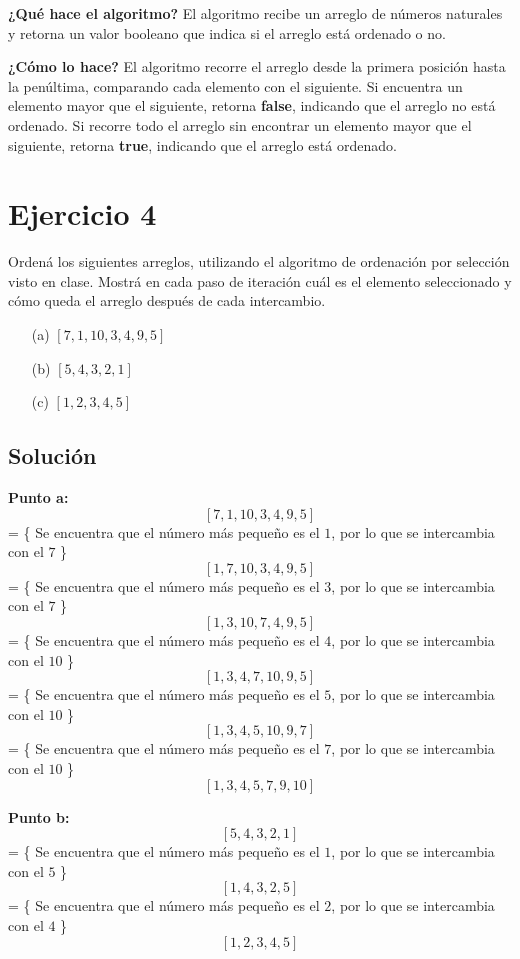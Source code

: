 \documentclass{article}
\begin{document}
\textbf{¿Qué hace el algoritmo?} El algoritmo recibe un arreglo de números naturales y retorna un valor booleano que indica si el arreglo está ordenado o no.

\textbf{¿Cómo lo hace?} El algoritmo recorre el arreglo desde la primera posición hasta la penúltima, comparando cada elemento con el siguiente. Si encuentra un elemento mayor que el siguiente, retorna \textbf{false}, indicando que el arreglo no está ordenado. Si recorre todo el arreglo sin encontrar un elemento mayor que el siguiente, retorna \textbf{true}, indicando que el arreglo está ordenado.

\section*{Ejercicio 4}
Ordená los siguientes arreglos, utilizando el algoritmo de ordenación por selección visto en clase. Mostrá en cada paso de iteración cuál es el elemento seleccionado y cómo queda el arreglo después de cada intercambio.

\begin{itemize}
    \item[(a)] $[7, 1, 10, 3, 4, 9, 5]$
    \item[(b)] $[5, 4, 3, 2, 1]$
    \item[(c)] $[1, 2, 3, 4, 5]$
\end{itemize}

\subsection*{Solución}
\textbf{Punto a:} 
$$[7, 1, 10, 3, 4, 9, 5]$$
= \{ Se encuentra que el número más pequeño es el $1$, por lo que se intercambia con el $7$ \}
$$[1, 7, 10, 3, 4, 9, 5]$$
= \{ Se encuentra que el número más pequeño es el $3$, por lo que se intercambia con el $7$ \}
$$[1, 3, 10, 7, 4, 9, 5]$$
= \{ Se encuentra que el número más pequeño es el $4$, por lo que se intercambia con el $10$ \}
$$[1, 3, 4, 7, 10, 9, 5]$$
= \{ Se encuentra que el número más pequeño es el $5$, por lo que se intercambia con el $10$ \}
$$[1, 3, 4, 5, 10, 9, 7]$$
= \{ Se encuentra que el número más pequeño es el $7$, por lo que se intercambia con el $10$ \}
$$[1, 3, 4, 5, 7, 9, 10]$$


\textbf{Punto b:}
$$[5, 4, 3, 2, 1]$$
= \{ Se encuentra que el número más pequeño es el $1$, por lo que se intercambia con el $5$ \}
$$[1, 4, 3, 2, 5]$$
= \{ Se encuentra que el número más pequeño es el $2$, por lo que se intercambia con el $4$ \}
$$[1, 2, 3, 4, 5]$$
\end{document}
